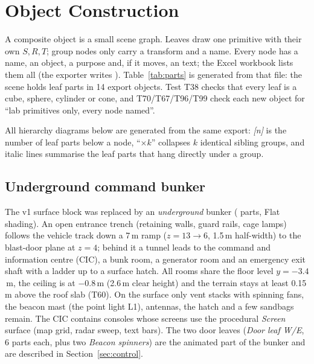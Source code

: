 \section{Object Construction}\label{sec:construction}
A composite object is a small scene graph. Leaves draw one primitive with their own $S,R,T$; group nodes only carry
a transform and a name. Every node has a name, an object, a purpose and, if it moves, an  text;
the Excel workbook lists them all (the exporter writes ). Table~\ref{tab:parts} is
generated from that file: the scene holds \nLeaves{} leaf parts in 14 export objects. Test T38 checks that every
leaf is a cube, sphere, cylinder or cone, and T70/T67/T96/T99 check each new object for ``lab primitives only,
every node named''.

\begin{table}[h]
\centering\small
\caption{Parts per composite object, generated from . Depth is the deepest group
level. The \emph{Target Rover} row counts all three intruders (\partsRover{} parts each). Base, bunker and
environment counts are the values at the time of the last export; they grow when engineers add detail, and
the table is regenerated by .}
\label{tab:parts}

\end{table}

\noindent All hierarchy diagrams below are generated from the same export: \emph{[n]} is the number of leaf
parts below a node, ``$\times k$'' collapses $k$ identical sibling groups, and italic lines summarise the leaf
parts that hang directly under a group.

\subsection{Underground command bunker}
The v1 surface block was replaced by an \emph{underground} bunker (\partsBunker{} parts, Flat shading). An open
entrance trench (retaining walls, guard rails, cage lamps) follows the vehicle track down a 7\,m ramp
($z=13\to6$, 1.5\,m half-width) to the blast-door plane at $z=4$; behind it a tunnel leads to the command and
information centre (CIC), a bunk room, a generator room and an emergency exit shaft with a ladder up to a surface
hatch. All rooms share the floor level $y=-3.4$\,m, the ceiling is at $-0.8$\,m (2.6\,m clear height) and the
terrain stays at least 0.15\,m above the roof slab (T60). On the surface only vent stacks with spinning fans, the
beacon mast (the point light L1), antennas, the hatch and a few sandbags remain. The CIC contains consoles whose
screens use the procedural \emph{Screen} surface (map grid, radar sweep, text bars). The two door leaves
(\emph{Door leaf W/E}, 6 parts each, plus two \emph{Beacon spinners}) are the animated part of the bunker and
are described in Section~\ref{sec:control}.

